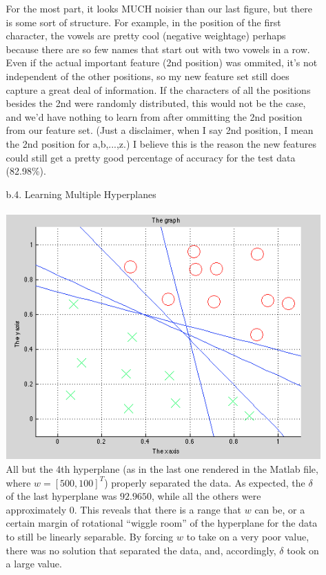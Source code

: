 \begin{enumerate}
\begin{enumerate}
                For the most part, it looks MUCH noisier than our last figure, but there is some sort of structure. For example, in the position of the first character, the vowels are pretty cool (negative weightage) perhaps because there are so few names that start out with two vowels in a row. Even if the actual important feature (2nd position) was ommited, it's not independent of the other positions, so my new feature set still does capture a great deal of information. If the characters of all the positions besides the 2nd were randomly distributed, this would not be the case, and we'd have nothing to learn from after ommitting the 2nd position from our feature set. (Just a disclaimer, when I say 2nd position, I mean the 2nd position for a,b,...,z.) I believe this is the reason the new features could still get a pretty good percentage of accuracy for the test data (82.98\%).
        \item[b.4.] Learning Multiple Hyperplanes\\\\
                 \includegraphics[scale=0.5]{learnMultipleHyperplanes}\\
                 All but the 4th hyperplane (as in the last one rendered in the Matlab file, where $w=[500,100]^T$) properly separated the data. As expected, the $\delta$ of the last hyperplane was $92.9650$, while all the others were approximately $0$. This reveals that there is a range that $w$ can be, or a certain margin of rotational ``wiggle room'' of the hyperplane for the data to still be linearly separable. By forcing $w$ to take on a very poor value, there was no solution that separated the data, and, accordingly, $\delta$ took on a large value. \\\\

\end{enumerate}
\end{enumerate}
